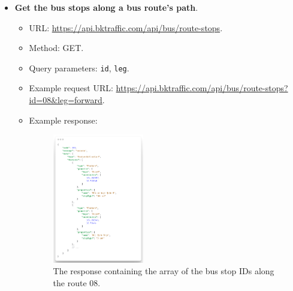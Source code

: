 \begin{itemize}
    \item \textbf{Get the bus stops along a bus route's path}.
    \begin{itemize}
        \item URL: \url{https://api.bktraffic.com/api/bus/route-stops}.
        \item Method: GET.
        \item Query parameters: \lstinline{id}, \lstinline{leg}.
        \item Example request URL: \url{https://api.bktraffic.com/api/bus/route-stops?id=08&leg=forward}.
        \item Example response:
        \begin{figure}[H]
            \centering
            \includegraphics[width=0.4\textwidth]{assets/images/Implementation/route_stops_response.png}
            \caption{The response containing the array of the bus stop IDs along the route 08.}
            \label{fig:route_stops_response}
        \end{figure}
    \end{itemize}


\end{itemize}
